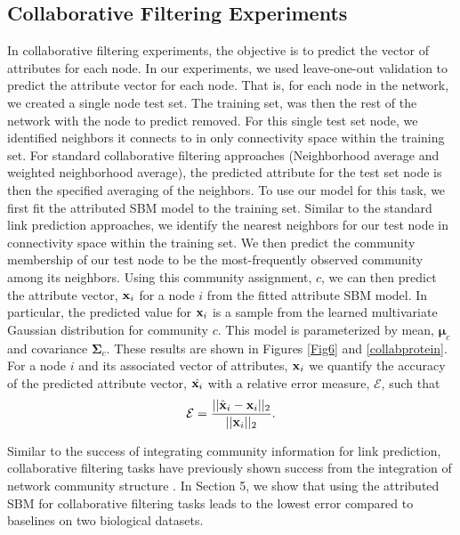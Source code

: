 \subsection{Collaborative Filtering Experiments}
In collaborative filtering experiments, the objective is to predict the vector of attributes for each node. In our experiments, we used leave-one-out validation to predict the attribute vector for each node. That is, for each node in the network, we created a single node test set. The training set, was then the rest of the network with the node to predict removed. For this single test set node, we identified neighbors it connects to in only connectivity space within the training set. For standard collaborative filtering approaches (Neighborhood average and weighted neighborhood average), the predicted attribute for the test set node is then the specified averaging of the neighbors. To use our model for this task, we first fit the attributed SBM model to the training set. Similar to the standard link prediction approaches, we identify the nearest neighbors for our test node in connectivity space within the training set. We then predict the community membership of our test node to be the most-frequently observed community among its neighbors. Using this community assignment, $c$, we can then predict the attribute vector, ${\bf x}_{i}$ for a node $i$ from the fitted attribute SBM model. In particular, the predicted value for ${\bf x}_{i}$ is a sample from the learned multivariate Gaussian distribution for community $c$. This model is parameterized by mean, $\boldsymbol{\mu}_{c}$ and covariance $\boldsymbol{\Sigma}_{c}$. These results are shown in Figures \ref{Fig6} and \ref{collabprotein}. For a node $i$ and its associated vector of attributes, ${\bf x}_{i}$ we quantify the accuracy of the predicted attribute vector, $\hat{{\bf x}_{i}}$ with a relative error measure, $\mathcal{E}$, such that 
\begin{equation}
\mathcal{E}=\frac{||\hat{\bf{x}}_{i}-{\bf x}_{i}||_{2}}{||{\bf x}_{i}||_{2}}.
\end{equation}

Similar to the success of integrating community information for link prediction, collaborative filtering tasks have previously shown success from the integration of network community structure \cite{collabComm}. In Section 5, we show that using the attributed SBM for collaborative filtering tasks leads to the lowest error compared to baselines on two biological datasets. 

